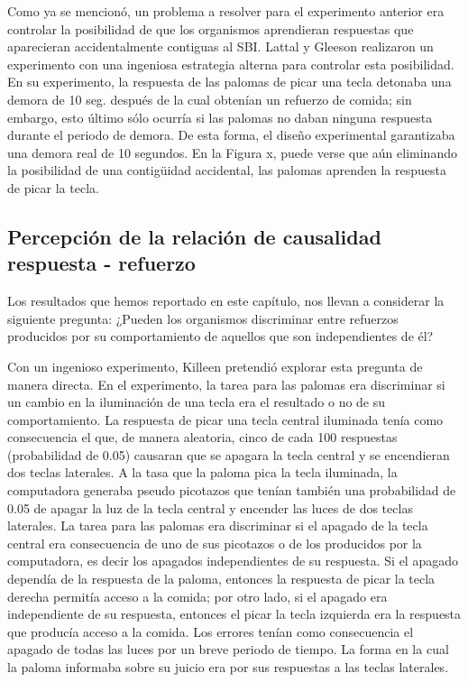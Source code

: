 \documentclass[
  a4paper,
  DIV=11,
  numbers=noendperiod]{scrreprt}
\begin{document}
Como ya se mencionó, un problema a resolver para el experimento anterior
era controlar la posibilidad de que los organismos aprendieran
respuestas que aparecieran accidentalmente contiguas al SBI. Lattal y
Gleeson realizaron un experimento con una ingeniosa estrategia alterna
para controlar esta posibilidad. En su experimento, la respuesta de las
palomas de picar una tecla detonaba una demora de 10 seg. después de la
cual obtenían un refuerzo de comida; sin embargo, esto último sólo
ocurría si las palomas no daban ninguna respuesta durante el periodo de
demora. De esta forma, el diseño experimental garantizaba una demora
real de 10 segundos. En la Figura x, puede verse que aún eliminando la
posibilidad de una contigüidad accidental, las palomas aprenden la
respuesta de picar la tecla.

\subsection{Percepción de la relación de causalidad respuesta -
refuerzo}\label{percepciuxf3n-de-la-relaciuxf3n-de-causalidad-respuesta---refuerzo}

Los resultados que hemos reportado en este capítulo, nos llevan a
considerar la siguiente pregunta: ¿Pueden los organismos discriminar
entre refuerzos producidos por su comportamiento de aquellos que son
independientes de él?

Con un ingenioso experimento, Killeen pretendió explorar esta pregunta
de manera directa. En el experimento, la tarea para las palomas era
discriminar si un cambio en la iluminación de una tecla era el resultado
o no de su comportamiento. La respuesta de picar una tecla central
iluminada tenía como consecuencia el que, de manera aleatoria, cinco de
cada 100 respuestas (probabilidad de 0.05) causaran que se apagara la
tecla central y se encendieran dos teclas laterales. A la tasa que la
paloma pica la tecla iluminada, la computadora generaba pseudo picotazos
que tenían también una probabilidad de 0.05 de apagar la luz de la tecla
central y encender las luces de dos teclas laterales. La tarea para las
palomas era discriminar si el apagado de la tecla central era
consecuencia de uno de sus picotazos o de los producidos por la
computadora, es decir los apagados independientes de su respuesta. Si el
apagado dependía de la respuesta de la paloma, entonces la respuesta de
picar la tecla derecha permitía acceso a la comida; por otro lado, si el
apagado era independiente de su respuesta, entonces el picar la tecla
izquierda era la respuesta que producía acceso a la comida. Los errores
tenían como consecuencia el apagado de todas las luces por un breve
periodo de tiempo. La forma en la cual la paloma informaba sobre su
juicio era por sus respuestas a las teclas laterales.
\end{document}
